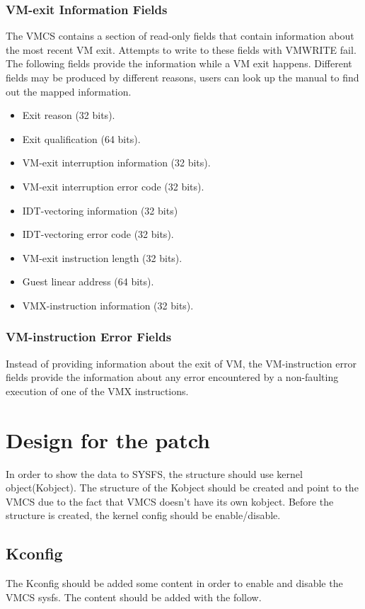 \documentclass[10pt,draftclsnofoot,journal,compsoc,onecolumn]{IEEEtran}
\begin{document}
\subsubsection{VM-exit Information Fields}
	\par The VMCS contains a section of read-only fields that contain information about the most recent VM exit. Attempts to write to these fields with VMWRITE fail. The following fields provide the information while a VM exit happens. Different fields may be produced by different reasons, users can look up the manual to find out the mapped information.
\begin{itemize}
  \item Exit reason (32 bits).
  \item Exit qualification (64 bits).
  \item VM-exit interruption information (32 bits).
  \item VM-exit interruption error code (32 bits).
  \item IDT-vectoring information (32 bits)
  \item IDT-vectoring error code (32 bits).
  \item VM-exit instruction length (32 bits).
  \item Guest linear address (64 bits).
  \item VMX-instruction information (32 bits).
\end{itemize}
    
\subsubsection{VM-instruction Error Fields}
Instead of providing information about the exit of VM, the VM-instruction error fields provide the information about any error encountered by a non-faulting execution of one of the VMX instructions.

\section{Design for the patch}
\par In order to show the data to SYSFS, the structure should use kernel object(Kobject). The structure of the Kobject should be created and point to the VMCS due to the fact that VMCS doesn’t have its own kobject. Before the structure is created, the kernel config should be enable/disable.

\subsection{Kconfig}
\par The Kconfig should be added some content in order to enable and disable the VMCS sysfs. The content should be added with the follow.
\end{document}
